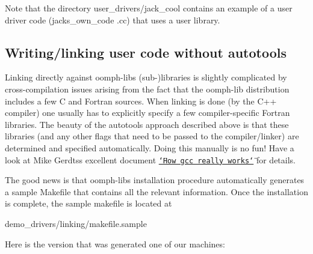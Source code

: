 Note that the directory {\ttfamily user\+\_\+drivers/jack\+\_\+cool} contains an example of a user driver code ({\ttfamily jacks\+\_\+own\+\_\+code} {\ttfamily }.cc) that uses a user library.\hypertarget{index_dont_have_auto_tools}{}\subsection{Writing/linking user code without autotools}\label{index_dont_have_auto_tools}
Linking directly against {\ttfamily oomph-\/lib\textquotesingle{}s} (sub-\/)libraries is slightly complicated by cross-\/compilation issues arising from the fact that the {\ttfamily oomph-\/lib} distribution includes a few C and Fortran sources. When linking is done (by the C++ compiler) one usually has to explicitly specify a few compiler-\/specific Fortran libraries. The beauty of the {\ttfamily autotools} approach described above is that these libraries (and any other flags that need to be passed to the compiler/linker) are determined and specified automatically. Doing this manually is no fun! Have a look at Mike Gerdts\textquotesingle{}s excellent document \href{https://sites.google.com/site/mgerdts/whatgccreallydoes}{\tt \char`\"{}\+How gcc really works\char`\"{}} for details.

The good news is that {\ttfamily oomph-\/lib\textquotesingle{}s} installation procedure automatically generates a sample {\ttfamily Makefile} that contains all the relevant information. Once the installation is complete, the sample makefile is located at 
\begin{DoxyCode}
demo\_drivers/linking/makefile.sample
\end{DoxyCode}
 Here is the version that was generated one of our machines\+:


